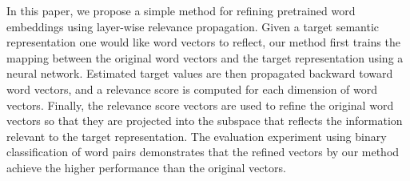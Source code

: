 In this paper, we propose a simple method for refining pretrained word embeddings using layer-wise relevance propagation. Given a target semantic representation one would like word vectors to reflect, our method first trains the mapping between the original word vectors and the target representation using a neural network. Estimated target values are then propagated backward toward word vectors, and a relevance score is computed for each dimension of word vectors. Finally, the relevance score vectors are used to refine the original word vectors so that they are projected into the subspace that reflects the information relevant to the target representation. The evaluation experiment using binary classification of word pairs demonstrates that the refined vectors by our method achieve the higher performance than the original vectors.
